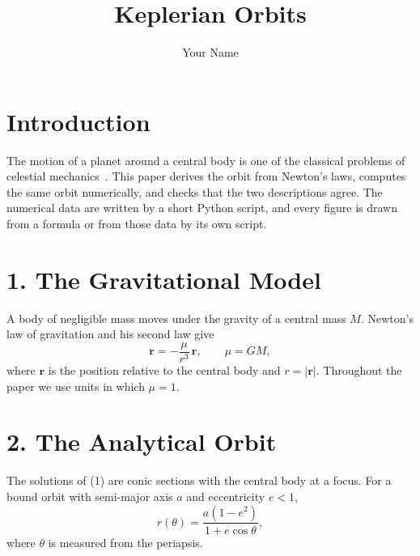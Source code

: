 \documentclass[11pt]{article}
\title{Keplerian Orbits}
\author{Your Name}
\date{}
\begin{document}
\maketitle

\section*{Introduction}

The motion of a planet around a central body is one of the
classical problems of celestial mechanics~\cite{curtis2020,murray1999}.
This paper derives the orbit from Newton's laws, computes the same orbit
numerically, and checks that the two descriptions agree.
The numerical data are written by a short Python script, and every figure
is drawn from a formula or from those data by its own script.

\section*{1. The Gravitational Model}

A body of negligible mass moves under the gravity of a central mass $M$.
Newton's law of gravitation and his second law give
\begin{equation}
  \ddot{\mathbf r} = -\frac{\mu}{r^3}\,\mathbf r, \qquad \mu = GM,
\end{equation}
where $\mathbf r$ is the position relative to the central body and $r = |\mathbf r|$.
Throughout the paper we use units in which $\mu = 1$.

\section*{2. The Analytical Orbit}

The solutions of (1) are conic sections with the central body at a focus.
For a bound orbit with semi-major axis $a$ and eccentricity $e < 1$,
\begin{equation}
  r(\theta) = \frac{a(1-e^2)}{1 + e\cos\theta},
\end{equation}
where $\theta$ is measured from the periapsis.
\end{document}
